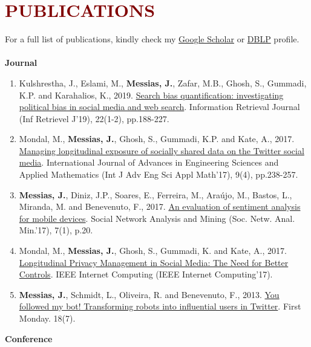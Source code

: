 
\section*{\textcolor{maroon}{\normalsize PUBLICATIONS}} 
For a full list of publications, kindly check my \href{https://scholar.google.com.br/citations?user=EoGEeFAAAAAJ}{Google Scholar} or \href{https://dblp.uni-trier.de/pers/hd/m/Messias:Johnnatan}{DBLP} profile. \\
\\
\textbf{Journal}

\begin{enumerate}

\item Kulshrestha, J., Eslami, M., \textbf{Messias, J.}, Zafar, M.B., Ghosh, S., Gummadi, K.P. and Karahalios, K., 2019. \href{https://t.co/RaTVDuUiMG}{Search bias quantification: investigating political bias in social media and web search}. Information Retrieval Journal (Inf Retrievel J'19), 22(1-2), pp.188-227.
\item Mondal, M., \textbf{Messias, J.}, Ghosh, S., Gummadi, K.P. and Kate, A., 2017. \href{http://rdcu.be/ARJP}{Managing longitudinal exposure of socially shared data on the Twitter social media}. International Journal of Advances in Engineering Sciences and Applied Mathematics (Int J Adv Eng Sci Appl Math'17), 9(4), pp.238-257.
\item \textbf{Messias, J.}, Diniz, J.P., Soares, E., Ferreira, M., Araújo, M., Bastos, L., Miranda, M. and Benevenuto, F., 2017. \href{http://rdcu.be/rZtC}{An evaluation of sentiment analysis for mobile devices}. Social Network Analysis and Mining (Soc. Netw. Anal. Min.'17), 7(1), p.20.
\item Mondal, M., \textbf{Messias, J.}, Ghosh, S., Gummadi, K. and Kate, A., 2017. \href{https://people.mpi-sws.org/~johnme/pdf/mondal_ic17.pdf}{Longitudinal Privacy Management in Social Media: The Need for Better Controls}. IEEE Internet Computing (IEEE Internet Computing'17).
\item \textbf{Messias, J.}, Schmidt, L., Oliveira, R. and Benevenuto, F., 2013. \href{http://firstmonday.org/ojs/index.php/fm/article/view/4217/3700}{You followed my bot! Transforming robots into influential users in Twitter}. First Monday. 18(7).

\end{enumerate}

\textbf{Conference}

